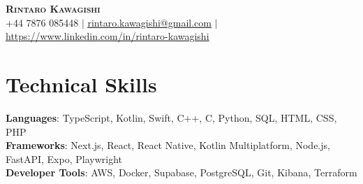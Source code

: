 \documentclass[letterpaper,11pt]{article}
\begin{document}

\begin{center}
    \textbf{\Huge \scshape Rintaro Kawagishi} \\ \vspace{1pt}
    +44 7876 085448 $|$ 
		\href{mailto:rintaro.kawagishi@gmail.com}{\underline{rintaro.kawagishi@gmail.com}} $|$ 
    \href{https://www.linkedin.com/in/rintaro-kawagishi}{\underline{https://www.linkedin.com/in/rintaro-kawagishi}}
\end{center}

\section{Technical Skills}
 \begin{itemize}[leftmargin=0.15in, label={}]
    \small{\item{
     \textbf{Languages}{: TypeScript, Kotlin, Swift, C++, C, Python, SQL, HTML, CSS, PHP} \\
     \textbf{Frameworks}{: Next.js, React, React Native, Kotlin Multiplatform, Node.js, FastAPI, Expo, Playwright} \\
     \textbf{Developer Tools}{: AWS, Docker, Supabase, PostgreSQL, Git, Kibana, Terraform}
    }}
 \end{itemize}
\end{document}
